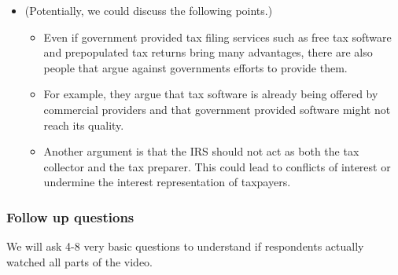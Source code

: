 \documentclass[11pt]{article}
\begin{document}
\begin{itemize}
\begin{itemize}
    \end{itemize}
    \item (Potentially, we could discuss the following points.)
    \begin{itemize} 
        \item Even if government provided tax filing services such as free tax software and prepopulated tax returns bring many advantages, there are also people that argue against governments efforts to provide them.
        \item For example, they argue that tax software is already being offered by commercial providers and that government provided software might not reach its quality. 
        \item Another argument is that the IRS should not act as both the tax collector and the tax preparer. This could lead to conflicts of interest or undermine the interest representation of taxpayers.
    \end{itemize}
\end{itemize}
\subsubsection*{Follow up questions}
We will ask 4-8 very basic questions to understand if respondents actually watched all parts of the video.

\newpage
\printbibliography
\end{document}
